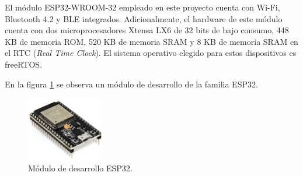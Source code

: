 El módulo ESP32-WROOM-32 empleado en este proyecto cuenta con Wi-Fi, Bluetooth 4.2 y BLE integrados. Adicionalmente, el hardware de este módulo cuenta con dos microprocesadores Xtensa LX6 de 32 bits de bajo consumo, 448 KB de memoria ROM, 520 KB de memoria SRAM y 8 KB de memoria SRAM en el RTC (\textit{Real Time Clock}). El sistema operativo elegido para estos dispositivos es freeRTOS\citep{esp32}.

En la figura \ref{fig:esp32} se observa un módulo de desarrollo de la familia ESP32.



\begin{figure}[h]
	\centering
	\includegraphics[width=0.30\textwidth]{./Figures/esp32.jpg}
	\caption[Módulo de desarrollo ESP32.]{Módulo de desarrollo ESP32.}
	\label{fig:esp32}

\end{figure}

